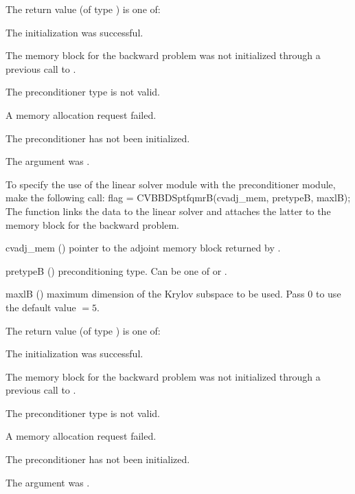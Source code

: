 {
  The return value  (of type ) is one of:
  \begin{args}
  \item[\Id{CVSPILS\_SUCCESS}] 
    The {\cvspbcg} initialization was successful.
  \item[\Id{CVSPILS\_MEM\_NULL}]
    The {\cvodes} memory block for the backward problem was not initialized through a 
    previous call to .
  \item[\Id{CVSPILS\_ILL\_INPUT}]
    The preconditioner type  is not valid.
  \item[\Id{CVSPILS\_MEM\_FAIL}]
    A memory allocation request failed.
  \item[\Id{CVBBDPRE\_PDATA\_NULL}]
    The {\cvbbdpre} preconditioner has not been initialized.
  \item[\Id{CVBBDPRE\_ADJMEM\_NULL}]
    The  argument was .
  \end{args}
}
{}
To specify the use of the {\cvsptfqmr} linear solver module with the {\cvbbdpre} 
preconditioner module, make the following call:
{
  flag = CVBBDSptfqmrB(cvadj\_mem, pretypeB, maxlB);
}
{
  The function  links the {\cvbbdpre} data to the
  {\cvsptfqmr} linear solver and attaches the latter to the {\cvodes}
  memory block for the backward problem.
}
{
  \begin{args}
  \item[cvadj\_mem] ()
    pointer to the adjoint memory block returned by .
  \item[pretypeB] ()
    preconditioning type. Can be one of  or .
  \item[maxlB] ()
    maximum dimension of the Krylov subspace to be used. Pass $0$ to use the 
    default value $=5$.
  \end{args}
}
{
  The return value  (of type ) is one of:
  \begin{args}
  \item[\Id{CVSPILS\_SUCCESS}] 
    The {\cvsptfqmr} initialization was successful.
  \item[\Id{CVSPILS\_MEM\_NULL}]
    The {\cvodes} memory block for the backward problem was not initialized through a 
    previous call to .
  \item[\Id{CVSPILS\_ILL\_INPUT}]
    The preconditioner type  is not valid.
  \item[\Id{CVSPILS\_MEM\_FAIL}]
    A memory allocation request failed.
  \item[\Id{CVBBDPRE\_PDATA\_NULL}]
    The {\cvbbdpre} preconditioner has not been initialized.
  \item[\Id{CVBBDPRE\_ADJMEM\_NULL}]
    The  argument was .
  \end{args}
}

